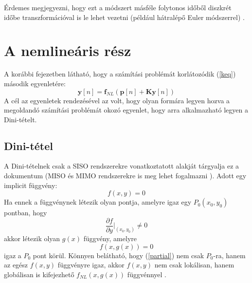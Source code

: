 Érdemes megjegyezni, hogy ezt a módszert másféle folytonos időből diszkrét időbe transzformációval 
is le lehet vezetni (például hátralépő Euler módszerrel) \cite{borin}.

\section{A nemlineáris rész}
A korábbi fejezetben látható, hogy a számítási problémát korlátozódik (\ref{keq}) második 
egyenletére:
\begin{equation}
    \mathbf{y}[n]=\mathbf{f}_{NL}(\mathbf{p}[n]+\mathbf{Ky}[n])
    \label{nonlineq}
\end{equation}
A cél az egyenletek rendezésével az volt, hogy olyan formára legyen hozva a megoldandó számítási 
problémát okozó egyenlet, hogy arra alkalmazható legyen a Dini-tételt.
\subsection{Dini-tétel}
A Dini-tételnek csak a SISO rendszerekre vonatkoztatott alakját tárgyalja ez a dokumentum (MISO és 
MIMO rendszerekre is meg lehet fogalmazni \cite{borin}). Adott egy implicit függvény: 
\begin{equation}
    f(x,y)=0
\end{equation}
Ha ennek a függvénynek létezik olyan pontja, amelyre igaz egy $P_0(x_0, y_0)$ pontban, hogy
\begin{equation}
    \frac{\partial{f}}{\partial{y}}\biggr |_{(x_0, y_0)} \neq 0
    \label{partial}
\end{equation}
akkor létezik olyan $g(x)$ függvény, amelyre
\begin{equation}
    f(x, g(x))=0
\end{equation}
igaz a $P_0$ pont körül. Könnyen belátható, hogy (\ref{partial}) nem csak $P_0$-ra, hanem az egész 
$f(x,y)$ függvényre igaz, akkor $f(x,y)$ nem csak lokálisan, hanem globálisan is kifejezhető 
$f_{NL}(x,g(x))$ függvénnyel \cite{borin}.


